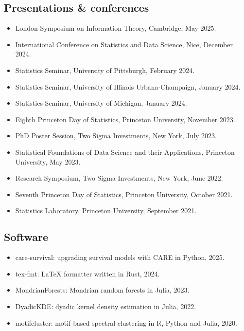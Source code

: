 \documentclass{wgu-cv}
\begin{document}
\subsection{Presentations \& conferences}{}
\begin{itemize}
  \item London Symposium on Information Theory, Cambridge,
    May 2025.
  \item International Conference on Statistics and Data Science, Nice,
    December 2024.
  \item Statistics Seminar, University of Pittsburgh,
    February 2024.
  \item Statistics Seminar, University of Illinois Urbana-Champaign,
    January 2024.
  \item Statistics Seminar, University of Michigan,
    January 2024.
  \item Eighth Princeton Day of Statistics, Princeton University,
    November 2023.
  \item PhD Poster Session, Two Sigma Investments, New York,
    July 2023.
  \item Statistical Foundations of Data Science and their Applications,
    Princeton University,
    May 2023.
  \item Research Symposium, Two Sigma Investments, New York,
    June 2022.
  \item Seventh Princeton Day of Statistics, Princeton University,
    October 2021.
  \item Statistics Laboratory, Princeton University,
    September 2021.
\end{itemize}

\subsection{Software}{}
\begin{itemize}

  \item care-survival: upgrading survival models with CARE in Python, 2025. \\

  \item tex-fmt: LaTeX formatter written in Rust, 2024.

  \item MondrianForests: Mondrian random forests in Julia, 2023. \\

  \item DyadicKDE: dyadic kernel density estimation in Julia, 2022. \\

  \item motifcluster: motif-based spectral clustering
    in R, Python and Julia, 2020. \\

\end{itemize}
\end{document}
